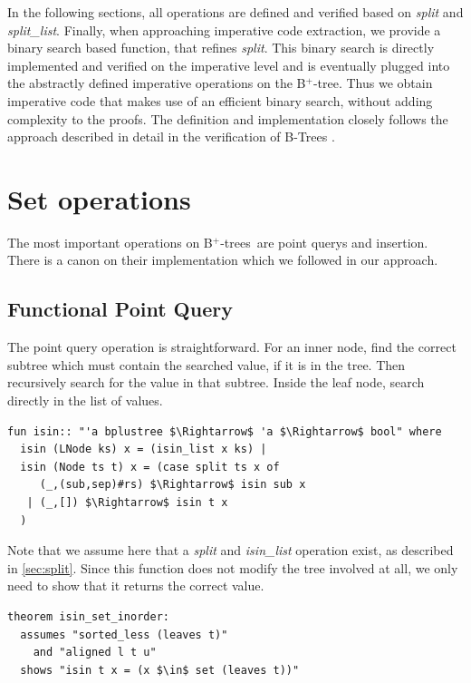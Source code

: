 \documentclass[a4paper,UKenglish,cleveref, autoref, thm-restate]{lipics-v2021}
\newcommand{\btree}{B$^+$-tree}
\newcommand{\btrees}{B$^+$-trees}
\begin{document}
In the following sections, all operations are defined and verified
based on \emph{split} and \emph{split\_list}.
Finally, when approaching imperative code extraction,
we provide a binary search based function, that refines \emph{split}.
This binary search is directly implemented and verified on the imperative
level and is eventually plugged into the abstractly defined
imperative operations on the \btree.
Thus we obtain imperative code that makes use of an efficient
binary search, without adding complexity to the proofs.
The definition and implementation closely follows
the approach described in detail in the
verification of B-Trees \cite{DBLP:journals/afp/Mundler21}.


\section{Set operations}
\label{sec:set}

The most important operations on \btrees\ are point querys and insertion.
There is a canon on their implementation which we followed in our approach.

\subsection{Functional Point Query}
\label{sec:functional_pq}

The point query operation is straightforward.
For an inner node, find the correct subtree which must contain
the searched value, if it is in the tree.
Then recursively search for the value in that subtree.
Inside the leaf node, search directly in the list of values.

\begin{lstlisting}[mathescape=true, language=Isabelle,label=lst:isin-def]
fun isin:: "'a bplustree $\Rightarrow$ 'a $\Rightarrow$ bool" where
  isin (LNode ks) x = (isin_list x ks) |
  isin (Node ts t) x = (case split ts x of
     (_,(sub,sep)#rs) $\Rightarrow$ isin sub x
   | (_,[]) $\Rightarrow$ isin t x
  )
\end{lstlisting}

Note that we assume here that a \textit{split} and \textit{isin\_list} operation exist,
as described in \autoref{sec:split}.
Since this function does not modify the tree involved at all,
we only need to show that it returns the correct value.


\begin{lstlisting}[mathescape=true, language=Isabelle,label=lst:isin-set-inorder]
theorem isin_set_inorder:
  assumes "sorted_less (leaves t)"
    and "aligned l t u"
  shows "isin t x = (x $\in$ set (leaves t))"
\end{lstlisting}
\end{document}
